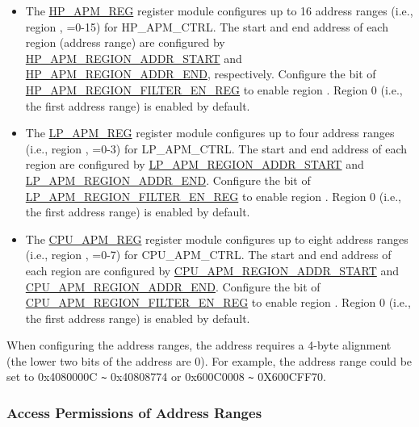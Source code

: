 \documentclass[main\_\_EN.tex]{subfiles}
\begin{document}
\begin{itemize}
    \item The \hyperref[sec:permctrl-reg-hp]{HP\_APM\_REG} register module configures up to 16 address ranges (i.e., region , =0-15) for HP\_APM\_CTRL. The start and end address of each region (address range) are configured by  \hyperref[regdesc:HPAPMREGIONNADDRSTARTREG]{HP\_APM\_REGION\_ADDR\_START} and \hyperref[regdesc:HPAPMREGIONNADDRENDREG]{HP\_APM\_REGION\_ADDR\_END}, respectively. Configure the bit  of \hyperref[fielddesc:HPAPMREGIONFILTEREN]{HP\_APM\_REGION\_FILTER\_EN\_REG} to enable region . Region 0 (i.e., the first address range) is enabled by default.

    \item The \hyperref[sec:permctrl-reg-lp]{LP\_APM\_REG} register module configures up to four address ranges (i.e., region , =0-3) for LP\_APM\_CTRL. The start and end address of each region are configured by \hyperref[fielddesc:LPAPMREGIONNADDRSTART]{LP\_APM\_REGION\_ADDR\_START} and \hyperref[fielddesc:LPAPMREGIONNADDREND]{LP\_APM\_REGION\_ADDR\_END}. Configure the bit  of \hyperref[fielddesc:LPAPMREGIONFILTEREN]{LP\_APM\_REGION\_FILTER\_EN\_REG} to enable region . Region 0 (i.e., the first address range) is enabled by default.

    \item The \hyperref[sec:permctrl-reg-cpu]{CPU\_APM\_REG} register module configures up to eight address ranges (i.e., region , =0-7) for CPU\_APM\_CTRL. The start and end address of each region are configured by \hyperref[fielddesc:CPUAPMREGIONNADDRSTART]{CPU\_APM\_REGION\_ADDR\_START} and \hyperref[fielddesc:CPUAPMREGIONNADDREND]{CPU\_APM\_REGION\_ADDR\_END}. Configure the bit  of \hyperref[fielddesc:CPUAPMREGIONFILTEREN]{CPU\_APM\_REGION\_FILTER\_EN\_REG} to enable region . Region 0 (i.e., the first address range) is enabled by default.
\end{itemize}

When configuring the address ranges, the address requires a 4-byte alignment (the lower two bits of the address are 0). For example, the address range could be set to 0x4080000C \verb+~+ 0x40808774 or 0x600C0008 \verb+~+ 0X600CFF70.

\subsubsection{Access Permissions of Address Ranges}
\end{document}
